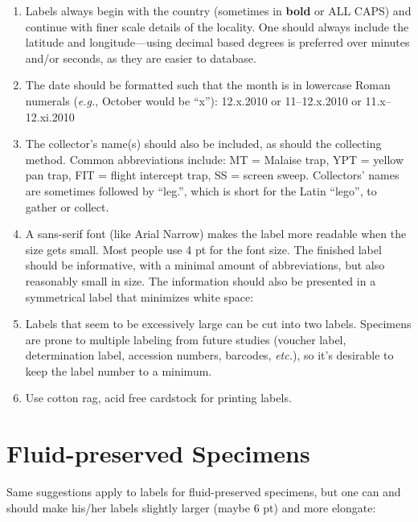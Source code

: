 \documentclass[letterpaper, 11pt]{article}
\newenvironment{labelfontsmall}{\fontfamily{phv}\selectfont}{\par}%
\begin{document}
\begin{enumerate}
\item Labels always begin with the country (sometimes in \textbf{bold} or ALL CAPS) and continue with finer scale details of the locality. One should always include the latitude and longitude---using decimal based degrees is preferred over minutes and/or seconds, as they are easier to database.
\item The date should be formatted such that the month is in lowercase Roman numerals (\textit{e.g.}, October would be ``x''): 12.x.2010 or 11--12.x.2010 or 11.x--12.xi.2010
\item The collector's name(s) should also be included, as should the collecting method. Common abbreviations include: MT = Malaise trap, YPT = yellow pan trap, FIT = flight intercept trap, SS = screen sweep. Collectors' names are sometimes followed by ``leg.'', which is short for the Latin ``lego'', to gather or collect.
\item A sans-serif font (like Arial Narrow) makes the label more readable when the size gets small. Most people use 4 pt for the font size. The finished label should be informative, with a minimal amount of abbreviations, but also reasonably small in size. The information should also be presented in a symmetrical label that minimizes white space:\\

\begin{labelfontsmall}
\tiny 
{}
\end{labelfontsmall}
\normalsize

\item Labels that seem to be excessively large can be cut into two labels. Specimens are prone to multiple labeling from future studies (voucher label, determination label, accession numbers, barcodes, \textit{etc.}), so it's desirable to keep the label number to a minimum.
\item Use cotton rag, acid free cardstock for printing labels.
\end{enumerate}

\section*{Fluid-preserved Specimens}%
Same suggestions apply to labels for fluid-preserved specimens, but one can and should make his/her labels slightly larger (maybe 6 pt) and more elongate:\\
\end{document}
